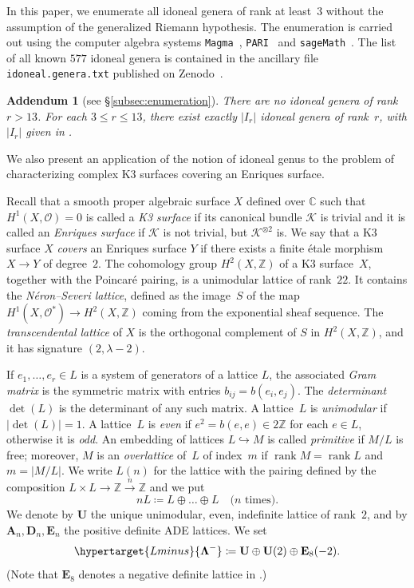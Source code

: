\documentclass[a4paper]{amsart}
\theoremstyle{definition}
\theoremstyle{plain}
\newtheorem{addendum}[definition]{Addendum}
\DeclareMathOperator{\rank}{rank}
\newcommand{\IC}{\mathbb{C}}
\newcommand{\IZ}{\mathbb{Z}}
\newcommand{\bA}{\mathbf{A}}
\newcommand{\bD}{\mathbf{D}}
\newcommand{\bE}{\mathbf{E}}
\newcommand{\bU}{\mathbf{U}}
\newcommand{\bLambda}{\mathbf{\Lambda}}
\newcommand{\cK}{\mathcal{K}}
\newcommand{\cO}{\mathcal{O}}
\begin{document}
In this paper, we enumerate all idoneal genera of rank at least~\(3\) without the assumption of the generalized Riemann hypothesis. The enumeration is carried out using the computer algebra systems \texttt{Magma}~\cite{magma}, \texttt{PARI}~\cite{pari} and \texttt{sageMath}~\cite{sage}.
The list of all known \(577\) idoneal genera is contained in the ancillary file \verb+idoneal.genera.txt+ published on Zenodo~\cite{brandhorst_2024_10617125}.


\begin{addendum}[see §\ref{subsec:enumeration}] \label{add:idoneal}
    There are no idoneal genera of rank \(r > 13\). For each \(3 \leq r \leq 13\), there exist exactly \(|I_r|\) idoneal genera of rank~\(r\), with \(|I_r|\) given in .
\end{addendum}

We also present an application of the notion of idoneal genus to the problem of characterizing complex K3 surfaces covering an Enriques surface. 

Recall that a smooth proper algebraic surface \(X\) defined over \(\IC\) such that \(H^1(X,\cO) = 0\) is called a \emph{K3 surface} if its canonical bundle \(\cK\) is trivial and it is called an \emph{Enriques surface} if \(\cK\) is not trivial, but \(\cK^{\otimes 2}\) is. We say that a K3 surface \(X\) \emph{covers} an Enriques surface \(Y\) if there exists a finite étale morphism \(X \to Y\) of degree~\(2\). 
The cohomology group \(H^2(X,\IZ)\) of a K3 surface~\(X\), together with the Poincaré pairing, is a unimodular lattice of rank~\(22\). 
It contains the \emph{Néron--Severi lattice}, defined as the image~\(S\) of the map \(H^1(X, \cO^*) \rightarrow H^2(X,\IZ)\) coming from the exponential sheaf sequence. The \emph{transcendental lattice} of \(X\) is the orthogonal complement of \(S\) in \(H^2(X,\IZ)\), and it has signature \((2, \lambda-2)\).

If \(e_1,\ldots,e_r \in L\) is a system of generators of a lattice $L$, the associated \emph{Gram matrix} is the symmetric matrix with entries \(b_{ij} = b(e_i,e_j)\).
The \emph{determinant} \(\det(L)\) is the determinant of any such matrix. A lattice~\(L\) is \emph{unimodular} if \(|{\det(L)}| = 1\).
A lattice~\(L\) is \emph{even} if \(e^2 = b(e,e) \in 2\IZ\) for each \(e \in L\), otherwise it is \emph{odd}.
An embedding of lattices \(L \hookrightarrow M\) is called \emph{primitive} if \(M/L\) is free; moreover, \(M\) is an \emph{overlattice} of~\(L\) of index~\(m\) if \(\rank M = \rank L\) and \(m = |M/L|\).
We write \(L(n)\) for the lattice with the pairing defined by the composition \(L \times L \rightarrow \IZ \xrightarrow{n} \IZ\) and we put
\[
n L \coloneqq L \oplus \ldots \oplus L \quad \text{(\(n\) times)}.
\]
We denote by \(\bU\) the unique unimodular, even, indefinite lattice of rank~\(2\), and by \(\bA_n,\bD_n,\bE_n\) the positive definite ADE lattices.
We set 
\[
    \hypertarget{Lminus}{\bLambda^-} \coloneqq \bU \oplus \bU(2) \oplus \bE_8(-2).
\]
(Note that \(\bE_8\) denotes a negative definite lattice in \cite{Keum90}.)
\end{document}
